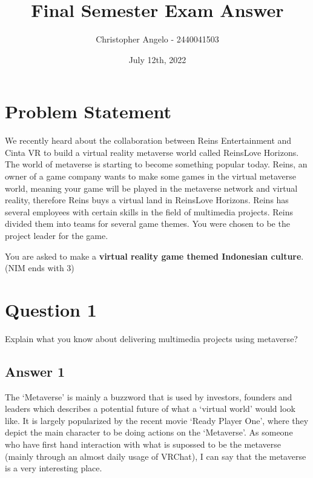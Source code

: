 \documentclass[
  11pt, %
]{assignment}
\author{Christopher Angelo - 2440041503}
\institute{BINUS University\\ Global Class}
\date{July 12th, 2022}
\title{Final Semester Exam Answer}
\begin{document}
\maketitle


\section*{Problem Statement}

\begin{problem}
We recently heard about the collaboration between Reins Entertainment and Cinta VR to build a virtual reality metaverse world called ReinsLove Horizons. The world of metaverse is starting to become something popular today. Reins, an owner of a game company wants to make some games in the virtual metaverse world, meaning your game will be played in the metaverse network and virtual reality, therefore Reins buys a virtual land in ReinsLove Horizons. Reins has several employees with certain skills in the field of multimedia projects. Reins divided them into teams for several game themes. You were chosen to be the project leader for the game.

\medskip

You are asked to make a \textbf{virtual reality game themed Indonesian culture}.\\
(NIM ends with \(3\))
\end{problem}

\section*{Question 1}

\begin{problem}
Explain what you know about delivering multimedia projects using metaverse?
\end{problem}

\subsection*{Answer 1}

The `Metaverse' is mainly a buzzword that is used by investors, founders and leaders which describes a potential future of what a `virtual world' would look like. It is largely popularized by the recent movie `Ready Player One', where they depict the main character to be doing actions on the `Metaverse'. As someone who have first hand interaction with what is supossed to be the metaverse (mainly through an almost daily usage of VRChat), I can say that the metaverse is a very interesting place.
\end{document}
